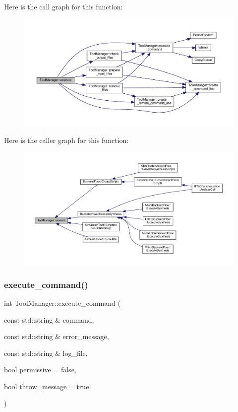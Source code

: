 Here is the call graph for this function\+:
\nopagebreak
\begin{figure}[H]
\begin{center}
\leavevmode
\includegraphics[width=350pt]{dc/dc5/classToolManager_a30f0f9fac713b19600315938cb211a87_cgraph}
\end{center}
\end{figure}
Here is the caller graph for this function\+:
\nopagebreak
\begin{figure}[H]
\begin{center}
\leavevmode
\includegraphics[width=350pt]{dc/dc5/classToolManager_a30f0f9fac713b19600315938cb211a87_icgraph}
\end{center}
\end{figure}
\mbox{\label{classToolManager_aa19f7107e57fbb649f0418bc074c0736}} 
\subsubsection{\texorpdfstring{execute\+\_\+command()}{execute\_command()}}
{\footnotesize\ttfamily int Tool\+Manager\+::execute\+\_\+command (\begin{DoxyParamCaption}\item[{const std\+::string \&}]{command,  }\item[{const std\+::string \&}]{error\+\_\+message,  }\item[{const std\+::string \&}]{log\+\_\+file,  }\item[{bool}]{permissive = {\ttfamily false},  }\item[{bool}]{throw\+\_\+message = {\ttfamily true} }\end{DoxyParamCaption})\hspace{0.3cm}{\ttfamily [protected]}}



